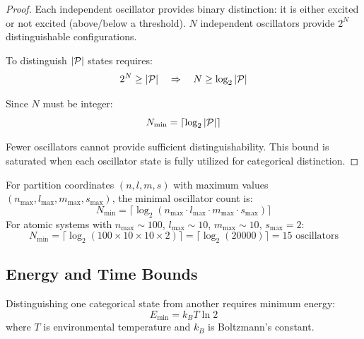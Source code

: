 \begin{proof}
Each independent oscillator provides binary distinction: it is either excited or not excited (above/below a threshold). $N$ independent oscillators provide $2^N$ distinguishable configurations.

To distinguish $|\mathcal{P}|$ states requires:
\begin{equation}
2^N \geq |\mathcal{P}| \quad \Rightarrow \quad N \geq \log_2 |\mathcal{P}|
\end{equation}

Since $N$ must be integer:
\begin{equation}
N_{\min} = \lceil \log_2 |\mathcal{P}| \rceil
\end{equation}

Fewer oscillators cannot provide sufficient distinguishability. This bound is saturated when each oscillator state is fully utilized for categorical distinction.
\end{proof}

\begin{corollary}
\label{cor:partition_oscillators}
For partition coordinates $(n, l, m, s)$ with maximum values $(n_{\max}, l_{\max}, m_{\max}, s_{\max})$, the minimal oscillator count is:
\begin{equation}
N_{\min} = \lceil \log_2(n_{\max} \cdot l_{\max} \cdot m_{\max} \cdot s_{\max}) \rceil
\end{equation}
For atomic systems with $n_{\max} \sim 100$, $l_{\max} \sim 10$, $m_{\max} \sim 10$, $s_{\max} = 2$:
\begin{equation}
N_{\min} = \lceil \log_2(100 \times 10 \times 10 \times 2) \rceil = \lceil \log_2(20000) \rceil = 15 \text{ oscillators}
\end{equation}
\end{corollary}

\subsection{Energy and Time Bounds}

\begin{theorem}
\label{thm:min_energy}
Distinguishing one categorical state from another requires minimum energy:
\begin{equation}
E_{\min} = k_B T \ln 2
\end{equation}
where $T$ is environmental temperature and $k_B$ is Boltzmann's constant.
\end{theorem}

